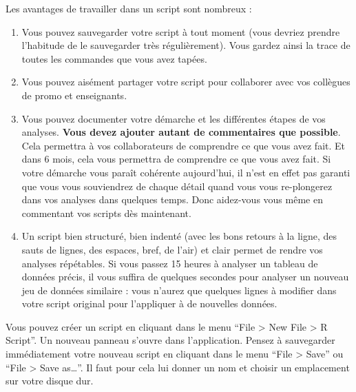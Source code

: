 \documentclass[
  a4paper,
  DIV=11,
  numbers=noendperiod,
  oneside]{scrreprt}
\providecommand{\tightlist}{%
  \setlength{\itemsep}{0pt}\setlength{\parskip}{0pt}}\usepackage{longtable,booktabs,array}
\begin{document}
Les avantages de travailler dans un script sont nombreux :

\begin{enumerate}
\def\labelenumi{\arabic{enumi}.}
\tightlist
\item
  Vous pouvez sauvegarder votre script à tout moment (vous devriez
  prendre l'habitude de le sauvegarder très régulièrement). Vous gardez
  ainsi la trace de toutes les commandes que vous avez tapées.
\item
  Vous pouvez aisément partager votre script pour collaborer avec vos
  collègues de promo et enseignants.
\item
  Vous pouvez documenter votre démarche et les différentes étapes de vos
  analyses. \textbf{Vous devez ajouter autant de commentaires que
  possible}. Cela permettra à vos collaborateurs de comprendre ce que
  vous avez fait. Et dans 6 mois, cela vous permettra de comprendre ce
  que vous avez fait. Si votre démarche vous paraît cohérente
  aujourd'hui, il n'est en effet pas garanti que vous vous souviendrez
  de chaque détail quand vous vous re-plongerez dans vos analyses dans
  quelques temps. Donc aidez-vous vous même en commentant vos scripts
  dès maintenant.
\item
  Un script bien structuré, bien indenté (avec les bons retours à la
  ligne, des sauts de lignes, des espaces, bref, de l'air) et clair
  permet de rendre vos analyses répétables. Si vous passez 15 heures à
  analyser un tableau de données précis, il vous suffira de quelques
  secondes pour analyser un nouveau jeu de données similaire : vous
  n'aurez que quelques lignes à modifier dans votre script original pour
  l'appliquer à de nouvelles données.
\end{enumerate}

Vous pouvez créer un script en cliquant dans le menu ``File
\textgreater{} New File \textgreater{} R Script''. Un nouveau panneau
s'ouvre dans l'application. Pensez à sauvegarder immédiatement votre
nouveau script en cliquant dans le menu ``File \textgreater{} Save'' ou
``File \textgreater{} Save as\ldots{}''. Il faut pour cela lui donner un
nom et choisir un emplacement sur votre disque dur.
\end{document}
